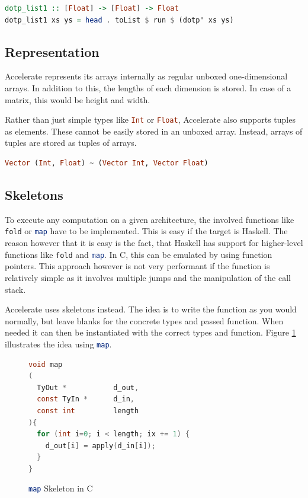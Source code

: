 \documentclass[a4paper,bibliography=totocnumbered,parskip,headsepline]{scrbook}
\begin{document}
\begin{lstlisting}[language=haskell]
dotp_list1 :: [Float] -> [Float] -> Float
dotp_list1 xs ys = head . toList $ run $ (dotp' xs ys)
\end{lstlisting}

\subsection{Representation}
Accelerate represents its arrays internally as regular unboxed one-dimensional arrays.
In addition to this, the lengths of each dimension is stored.
In case of a matrix, this would be height and width.

Rather than just simple types like \lstinline[language=haskell]!Int! or \lstinline[language=haskell]!Float!, Accelerate also supports tuples as elements.
These cannot be easily stored in an unboxed array.
Instead, arrays of tuples are stored as tuples of arrays.

\begin{lstlisting}[language=haskell]
Vector (Int, Float) ~ (Vector Int, Vector Float)
\end{lstlisting}

\subsection{Skeletons}
To execute any computation on a given architecture, the involved functions like \lstinline[language=haskell,morekeywords={fold}]!fold! or \lstinline[language=haskell]!map! have to be implemented.
This is easy if the target is Haskell.
The reason however that it is easy is the fact, that Haskell has support for higher-level functions like \lstinline[language=haskell,morekeywords={fold}]!fold! and \lstinline[language=haskell]!map!.
In C, this can be emulated by using function pointers.
This approach however is not very performant if the function is relatively simple as it involves multiple jumps and the manipulation of the call stack.

Accelerate uses skeletons instead.
The idea is to write the function as you would normally, but leave blanks for the concrete types and passed function.
When needed it can then be instantiated with the correct types and function.
Figure \ref{fig:mapskelC} illustrates the idea using \lstinline[language=haskell]!map!.

\begin{figure}[htb]
\begin{lstlisting}[language=C]
void map
(
  TyOut *           d_out,
  const TyIn *      d_in,
  const int         length
){
  for (int i=0; i < length; ix += 1) {
    d_out[i] = apply(d_in[i]);
  }
}
\end{lstlisting}
\caption{\lstinline[language=haskell]!map! Skeleton in C}
\label{fig:mapskelC}
\end{figure}
\end{document}
